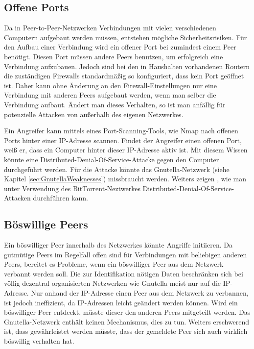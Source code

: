 \subsection{Offene Ports}
Da in Peer-to-Peer-Netzwerken Verbindungen mit vielen verschiedenen Computern aufgebaut werden müssen, entstehen mögliche Sicherheitsrisiken. Für den Aufbau einer Verbindung wird ein offener Port bei zumindest einem Peer benötigt. Diesen Port müssen andere Peers benutzen, um erfolgreich eine Verbindung aufzubauen. Jedoch sind bei den in Haushalten vorhandenen Routern die zuständigen Firewalls standardmäßig so konfiguriert, dass kein Port geöffnet ist. Daher kann ohne Änderung an den Firewall-Einstellungen nur eine Verbindung mit anderen Peers aufgebaut werden, wenn man selber die Verbindung aufbaut. Ändert man dieses Verhalten, so ist man anfällig für potenzielle Attacken von außerhalb des eigenen Netzwerkes. 

Ein Angreifer kann mittels eines Port-Scanning-Tools, wie Nmap nach offenen Ports hinter einer IP-Adresse scannen. Findet der Angreifer einen offenen Port, weiß er, dass ein Computer hinter dieser IP-Adresse aktiv ist. Mit diesem Wissen könnte eine Distributed-Denial-Of-Service-Attacke gegen den Computer durchgeführt werden. Für die Attacke könnte das Gnutella-Netzwerk (siehe Kapitel \ref{sec:GnutellaWeaknesses}) missbraucht werden. Weiters zeigen \textcite{el2007bottorrent}, wie man unter Verwendung des BitTorrent-Neztwerkes Distributed-Denial-Of-Service-Attacken durchführen kann.



\subsection{Böswillige Peers}
Ein böswilliger Peer innerhalb des Netzwerkes könnte Angriffe initiieren. Da gutmütige Peers im Regelfall offen sind für Verbindungen mit beliebigen anderen Peers, bereitet es Probleme, wenn ein böswilliger Peer aus dem Netzwerk verbannt werden soll. Die zur Identifikation nötigen Daten beschränken sich bei völlig dezentral organisierten Netzwerken wie Gnutella meist nur auf die IP-Adresse. Nur anhand der IP-Adresse einen Peer aus dem Netzwerk zu verbannen, ist jedoch ineffizient, da IP-Adressen leicht geändert werden können. Wird ein böswilliger Peer entdeckt, müsste dieser den anderen Peers mitgeteilt werden. Das Gnutella-Netzwerk enthält keinen Mechanismus, dies zu tun. Weiters erschwerend ist, dass gewährleistet werden müsste, dass der gemeldete Peer sich auch wirklich böswillig verhalten hat. 

